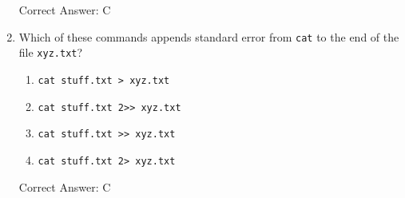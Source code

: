 \documentclass{article}
\begin{document}
\begin{enumerate}
\begin{enumerate}
    \end{enumerate}
    Correct Answer: C
    \item Which of these commands appends standard error from \texttt{cat} to the end of the file \texttt{xyz.txt}?
    \begin{enumerate}
        \item \texttt{cat stuff.txt > xyz.txt}
        \item \texttt{cat stuff.txt 2>> xyz.txt}
        \item \texttt{cat stuff.txt >> xyz.txt}
        \item \texttt{cat stuff.txt 2> xyz.txt}
    \end{enumerate}
    Correct Answer: C
\end{enumerate}
\end{document}
